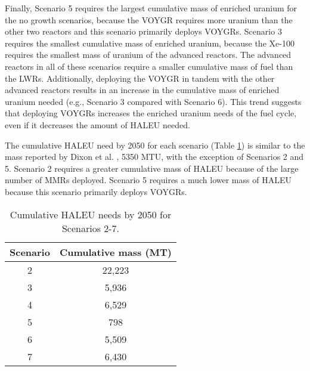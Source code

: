 Finally, Scenario 5 requires the largest cumulative mass of enriched uranium 
for the no growth scenarios, because the VOYGR requires more uranium than 
the other two reactors and this scenario primarily deploys VOYGRs. Scenario 3 
requires the smallest cumulative 
mass of enriched uranium, because the Xe-100 requires the smallest mass of 
uranium of the advanced reactors. The advanced reactors 
in all of these scenarios require a smaller cumulative mass of fuel than 
the \glspl{LWR}. Additionally, deploying the VOYGR in tandem with the other 
advanced reactors results in an increase in the cumulative mass 
of enriched uranium needed (e.g., Scenario 3 compared with Scenario 6). This
trend suggests that deploying VOYGRs increases the enriched uranium needs 
of the fuel cycle, even if it decreases the amount of \gls{HALEU} needed. 

The cumulative \gls{HALEU} need by 2050 for each scenario (Table 
\ref{tab:nogrowth_haleu}) is similar to the mass reported by 
Dixon et al. \cite{dixon_estimated_2022}, 5350 MTU, with the exception 
of Scenarios 2 and 5. Scenario 2 requires a greater cumulative mass of 
\gls{HALEU} because of the large number of \glspl{MMR} deployed. Scenario 
5 requires a much lower mass of \gls{HALEU} because this scenario primarily 
deploys VOYGRs. 

\begin{table}[h!]
    \centering 
    \caption{Cumulative HALEU needs by 2050 for Scenarios 2-7.}
    \label{tab:nogrowth_haleu}
    \begin{tabular}{c c}
        \hline 
        Scenario & Cumulative mass (MT) \\
        \hline
        2 & 22,223\\
        3 & 5,936 \\
        4 & 6,529 \\
        5 & 798 \\
        6 & 5,509 \\
        7 & 6,430 \\
        \hline        
    \end{tabular}
\end{table}

